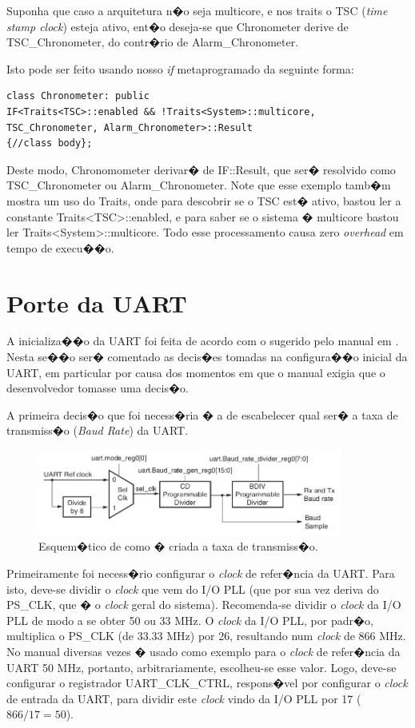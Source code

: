 \documentclass{ufscThesis/ufscThesis} %
\begin{document}
Suponha que caso a arquitetura n�o seja multicore, e nos traits o TSC (\emph{time stamp clock}) esteja ativo, ent�o deseja-se que Chronometer derive de TSC\_Chronometer, do contr�rio de Alarm\_Chronometer.

Isto pode ser feito usando nosso \emph{if} metaprogramado da seguinte forma:

\begin{verbatim}
class Chronometer: public
IF<Traits<TSC>::enabled && !Traits<System>::multicore,
TSC_Chronometer, Alarm_Chronometer>::Result
{//class body};
\end{verbatim}

Deste modo, Chronomometer derivar� de IF::Result, que ser� resolvido como TSC\_Chronometer ou Alarm\_Chronometer. Note que esse exemplo tamb�m mostra um uso do Traits, onde para descobrir se o TSC est� ativo, bastou ler a constante Traits<TSC>::enabled, e para saber se o sistema � multicore bastou ler Traits<System>::multicore. Todo esse processamento causa zero \emph{overhead} em tempo de execu��o.

\section{Porte da UART}

A inicializa��o da UART foi feita de acordo com o sugerido pelo manual em \cite[p.~554]{ug585}. Nesta se��o ser� comentado as decis�es tomadas na configura��o inicial da UART, em particular por causa dos momentos em que o manual exigia que o desenvolvedor tomasse uma decis�o.

A primeira decis�o que foi necess�ria � a de escabelecer qual ser� a taxa de transmiss�o (\emph{Baud Rate}) da UART. 

\begin{figure}[ht!]
    \centering
    \includegraphics[width=10cm]{figuras/uart_board_rate}
    \caption{Esquem�tico de como � criada a taxa de transmiss�o.}
	\label{fig:uart}
\end{figure}

Primeiramente foi necess�rio configurar o \emph{clock} de refer�ncia da UART. Para isto, deve-se dividir o \emph{clock} que vem do I/O PLL (que por sua vez deriva do PS\_CLK, que � o \emph{clock} geral do sistema). Recomenda-se dividir o \emph{clock} da I/O PLL de modo a se obter 50 ou 33 MHz.
O \emph{clock} da I/O PLL, por padr�o, multiplica o PS\_CLK (de 33.33 MHz) por 26, resultando num \emph{clock} de 866 MHz.
No manual diversas vezes � usado como exemplo para o \emph{clock} de refer�ncia da UART 50 MHz, portanto, arbitrariamente, escolheu-se esse valor. Logo, deve-se configurar o registrador UART\_CLK\_CTRL, respons�vel por configurar o \emph{clock} de entrada da UART, para dividir este \emph{clock} vindo da I/O PLL por 17 ($866/17 = 50$).
\end{document}
